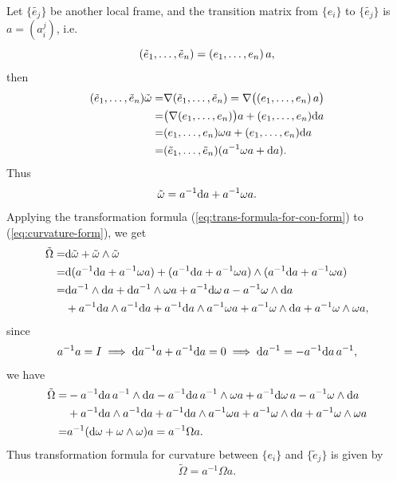 Let $\{\tilde{e_j}\}$ be another local frame, and the transition matrix 
from $\{e_i\}$ to $\{\tilde{e_j}\}$ is $a=(a_i^j)$, i.e. 
\begin{equation*}
    ({\tilde{e}}_{1},\dots,{\tilde{e}}_{n}) = ({e}_{1},\dots,{e}_{n})\, a, 
\end{equation*}
then 
\begin{align*}
    ({\tilde{e}}_{1},\dots,{\tilde{e}}_{n})\tilde{\omega} =& \nabla({\tilde{e}}_{1},\dots,{\tilde{e}}_{n}) 
    = \nabla\big(({e}_{1},\dots,{e}_{n})\, a\big) \\
    =& \big(\nabla({e}_{1},\dots,{e}_{n})\big) a + ({e}_{1},\dots,{e}_{n}) {\rm d} a \\
    =& ({e}_{1},\dots,{e}_{n}) \omega a + ({e}_{1},\dots,{e}_{n}) {\rm d} a \\
    =& ({\tilde{e}}_{1},\dots,{\tilde{e}}_{n}) (a^{-1} \omega a + {\rm d} a).
\end{align*}
Thus 
\begin{equation}\label{eq:trans-formula-for-con-form}
    \tilde{\omega} = a^{-1} {\rm d} a + a^{-1} \omega a.
\end{equation}
Applying the transformation formula (\ref{eq:trans-formula-for-con-form}) to (\ref{eq:curvature-form}), we get 
\begin{align*}
    \tilde{\Omega} =& {\rm d}\tilde{\omega} + \tilde{\omega}\wedge \tilde{\omega} \\
    =& {\rm d}(a^{-1} {\rm d} a + a^{-1} \omega a) + (a^{-1} {\rm d} a + a^{-1} \omega a)\wedge (a^{-1} {\rm d} a + a^{-1} \omega a) \\
    =& {\rm d} a^{-1} \wedge {\rm d} a + {\rm d} a^{-1} \wedge \omega a + a^{-1} {\rm d}\omega\, a - a^{-1} \omega \wedge {\rm d} a \\
    &+ a^{-1} {\rm d} a \wedge a^{-1} {\rm d} a + a^{-1} {\rm d} a \wedge a^{-1} \omega a 
    + a^{-1} \omega \wedge {\rm d} a + a^{-1} \omega \wedge \omega a, \\
\end{align*}
since
\begin{equation*}
    a^{-1}a = I \implies {\rm d} a^{-1} a + a^{-1} {\rm d} a = 0 \implies {\rm d} a^{-1} = -a^{-1} {\rm d} a\, a^{-1},
\end{equation*}
we have
\begin{align*}
    \tilde{\Omega} =& -a^{-1} {\rm d} a\, a^{-1} \wedge {\rm d} a - a^{-1} {\rm d} a\, a^{-1} \wedge \omega a + a^{-1} {\rm d}\omega\, a - a^{-1} \omega \wedge {\rm d} a \\
    &+ a^{-1} {\rm d} a \wedge a^{-1} {\rm d} a + a^{-1} {\rm d} a \wedge a^{-1} \omega a + a^{-1} \omega \wedge {\rm d} a + a^{-1} \omega \wedge \omega a \\
    =& a^{-1} ({\rm d}\omega + \omega\wedge\omega) a = a^{-1} \Omega a.
\end{align*}
Thus transformation formula for curvature between $\{e_i\}$ and $\{\tilde{e}_j\}$ is given by
\begin{equation}\label{eq:trans-formula-for-curvature}
    \tilde{\Omega} = a^{-1} \Omega a.
\end{equation}

